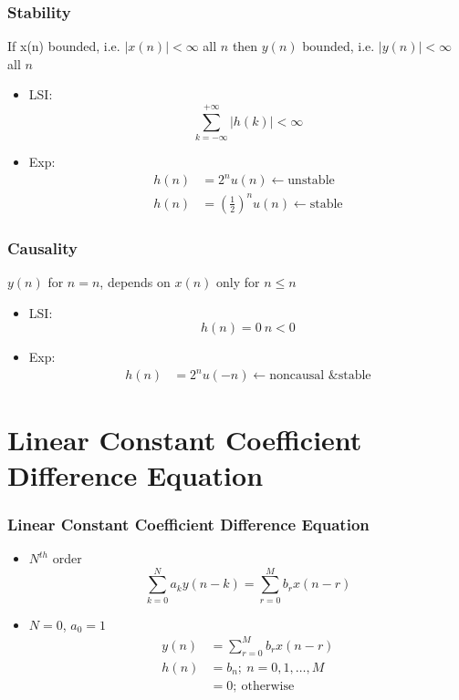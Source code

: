 \documentclass[pdflatex,compress]{beamer}
\begin{document}
\begin{frame}
	\frametitle{Stability}
	
	\begin{definition}
		If x(n) bounded, i.e. $ |x(n)| < \infty $ all $ n $ then $ y(n) $ bounded, i.e. $ |y(n)| < \infty $ all $ n $
	\end{definition}

	\begin{itemize}
		\item LSI: \[ \sum_{k = -\infty}^{+\infty} |h(k)|  < \infty \]
		\item Exp:
		\begin{align*}
			h(n) &= 2^n u(n) \leftarrow \text{unstable} \\
			h(n) &= (\frac{1}{2})^n u(n) \leftarrow \text{stable}
		\end{align*}
	\end{itemize}
\end{frame}

\begin{frame}
	\frametitle{Causality}
	
	\begin{definition}
		$ y(n) $ for $ n=n $, depends on $ x(n) $ only for $ n \leq n $
	\end{definition}
	
	\begin{itemize}
		\item LSI: \[ h(n) = 0 ~ n < 0 \]
		\item Exp:
		\begin{align*}
		h(n) &= 2^n u(-n) \leftarrow \text{noncausal \& stable}
		\end{align*}
	\end{itemize}
\end{frame}

\section{Linear Constant Coefficient Difference Equation}

\begin{frame}
	\frametitle{Linear Constant Coefficient Difference Equation}
	\begin{itemize}
		\item $ N^{th} $ order
		\[ \sum_{k = 0}^N a_k y(n-k) = \sum_{r = 0}^M b_r x(n-r) \]
		\item $ N = 0 $, $ a_0 = 1 $
		\begin{align*}
		y(n) &= \sum_{r = 0}^M b_r x(n-r) \\
		h(n) &= b_n;~n = 0, 1, \dots, M \\
		     &= 0;~\text{otherwise}
		\end{align*}
		
	\end{itemize}
\end{frame}
\end{document}
